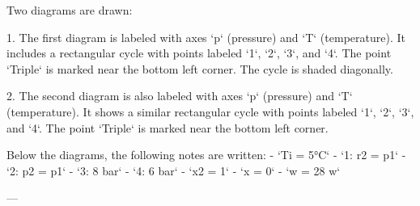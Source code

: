 Two diagrams are drawn:  

1. The first diagram is labeled with axes `p` (pressure) and `T` (temperature). It includes a rectangular cycle with points labeled `1`, `2`, `3`, and `4`. The point `Triple` is marked near the bottom left corner. The cycle is shaded diagonally.  

2. The second diagram is also labeled with axes `p` (pressure) and `T` (temperature). It shows a similar rectangular cycle with points labeled `1`, `2`, `3`, and `4`. The point `Triple` is marked near the bottom left corner.  

Below the diagrams, the following notes are written:  
- `Ti = 5°C`  
- `1: r2 = p1`  
- `2: p2 = p1`  
- `3: 8 bar`  
- `4: 6 bar`  
- `x2 = 1`  
- `x = 0`  
- `w = 28 w`  

---